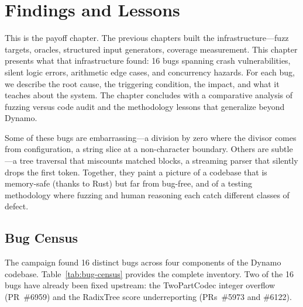 \chapter{Findings and Lessons}
\label{ch:findings}

This is the payoff chapter. The previous chapters built the infrastructure---fuzz targets, oracles, structured input generators, coverage measurement. This chapter presents what that infrastructure found: 16 bugs spanning crash vulnerabilities, silent logic errors, arithmetic edge cases, and concurrency hazards. For each bug, we describe the root cause, the triggering condition, the impact, and what it teaches about the system. The chapter concludes with a comparative analysis of fuzzing versus code audit and the methodology lessons that generalize beyond Dynamo.

Some of these bugs are embarrassing---a division by zero where the divisor comes from configuration, a string slice at a non-character boundary. Others are subtle---a tree traversal that miscounts matched blocks, a streaming parser that silently drops the first token. Together, they paint a picture of a codebase that is memory-safe (thanks to Rust) but far from bug-free, and of a testing methodology where fuzzing and human reasoning each catch different classes of defect.

\section{Bug Census}
\label{sec:findings:census}

%
The campaign found 16 distinct bugs across four components of the Dynamo codebase. Table~\ref{tab:bug-census} provides the complete inventory. Two of the 16 bugs have already been fixed upstream: the TwoPartCodec integer overflow (PR~\#6959) and the RadixTree score underreporting (PRs~\#5973 and \#6122).

